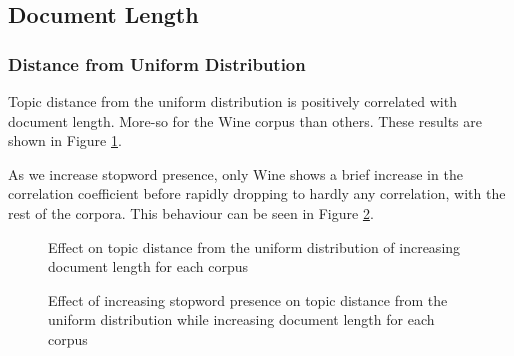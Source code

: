 \documentclass[letterpaper, 10 pt, conference]{ieeeconf}  %
\begin{document}
\subsection{Document Length}

\subsubsection{Distance from Uniform Distribution}
Topic distance from the uniform distribution is positively correlated with document length. More-so for the Wine corpus than others. These results are shown in Figure \ref{fig:dl_dist_uni}.

As we increase stopword presence, only Wine shows a brief increase in the correlation coefficient before rapidly dropping to hardly any correlation, with the rest of the corpora. This behaviour can be seen in Figure \ref{fig:dl_dist_uni_sw}.

\begin{figure}[thpb]
      \centering
      \caption{Effect on topic distance from the uniform distribution of increasing document length for each corpus}
      \label{fig:dl_dist_uni}
   \end{figure}
   
  \begin{figure}[thpb]
      \centering
      \caption{Effect of increasing stopword presence on topic distance from the uniform distribution while increasing document length for each corpus}
      \label{fig:dl_dist_uni_sw}
   \end{figure}
   
\end{document}
